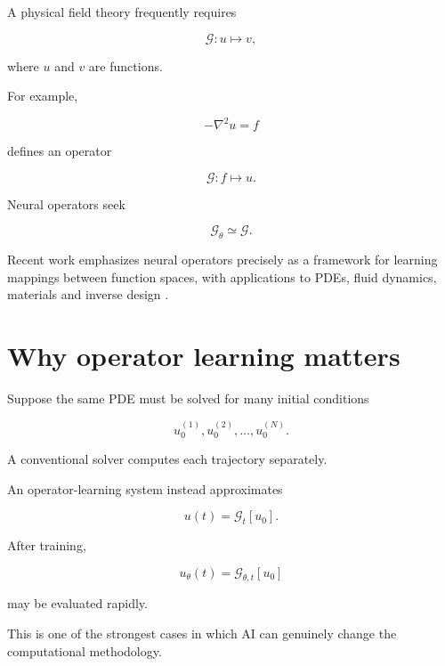 \documentclass[11pt,a4paper,oneside]{book}
\begin{document}
A physical field theory frequently requires

\begin{equation}
\mathcal{G}:u\mapsto v,
\end{equation}

where $u$ and $v$ are functions.

For example,

\begin{equation}
-\nabla^2u=f
\end{equation}

defines an operator

\begin{equation}
\mathcal{G}:f\mapsto u.
\end{equation}

Neural operators seek

\begin{equation}
\mathcal{G}_\theta\simeq\mathcal{G}.
\end{equation}

Recent work emphasizes neural operators precisely as a framework for learning
mappings between function spaces, with applications to PDEs, fluid dynamics,
materials and inverse design \citep{Azizzadenesheli2024}.

\section{Why operator learning matters}

Suppose the same PDE must be solved for many initial conditions

\begin{equation}
u_0^{(1)},u_0^{(2)},\ldots,u_0^{(N)}.
\end{equation}

A conventional solver computes each trajectory separately.

An operator-learning system instead approximates

\begin{equation}
u(t)
=
\mathcal{G}_t[u_0].
\end{equation}

After training,

\begin{equation}
u_\theta(t)
=
\mathcal{G}_{\theta,t}[u_0]
\end{equation}

may be evaluated rapidly.

This is one of the strongest cases in which AI can genuinely change the
computational methodology.
\end{document}
